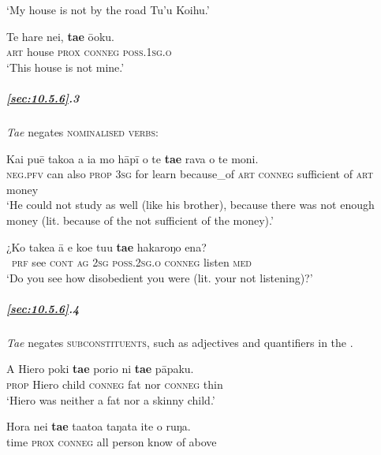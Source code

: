 \glt 
‘My house is not by the road Tu’u Koihu.’ \textstyleExampleref{[Notes]}
\z

\ea\label{ex:10.144}
\gll Te hare nei, \textbf{ta{\ꞌ}e} ō{\ꞌ}oku. \\
\textsc{art} house \textsc{prox} \textsc{conneg} \textsc{poss.1sg.o} \\

\glt 
‘This house is not mine.’ \textstyleExampleref{[R229.268]} 
\z

\subparagraph{\ref{sec:10.5.6}.3} \textit{Ta{\ꞌ}e} negates \textsc{nominalised verbs}:

\ea\label{ex:10.145}
\gll Kai puē tako{\ꞌ}a a ia mo hāpī {\ꞌ}o te \textbf{ta{\ꞌ}e} rava o te moni.\\
\textsc{neg.pfv} can also \textsc{prop} \textsc{3sg} for learn because\_of \textsc{art} \textsc{conneg} sufficient of \textsc{art} money\\

\glt 
‘He could not study as well (like his brother), because there was not enough money (lit. because of the not sufficient of the money).’ \textstyleExampleref{[R231.006]} 
\z

\ea\label{ex:10.146}
\gll ¿Ko take{\ꞌ}a {\ꞌ}ā e koe tu{\ꞌ}u \textbf{ta{\ꞌ}e} hakaroŋo ena? \\
~\textsc{prf} see \textsc{cont} \textsc{ag} \textsc{2sg} \textsc{poss.2sg.o} \textsc{conneg} listen \textsc{med} \\

\glt 
‘Do you see how disobedient you were (lit. your not listening)?’ \textstyleExampleref{[R481.117]} 
\z

\subparagraph{\ref{sec:10.5.6}.4} \textit{Ta{\ꞌ}e} negates \textsc{subconstituents}, such as adjectives  and quantifiers  in the .

\ea\label{ex:10.147}
\gll A Hiero poki \textbf{ta{\ꞌ}e} porio ni \textbf{ta{\ꞌ}e} pāpaku. \\
\textsc{prop} Hiero child \textsc{conneg} fat nor \textsc{conneg} thin \\

\glt 
‘Hiero was neither a fat nor a skinny child.’ \textstyleExampleref{[R315.020]} 
\z

\ea\label{ex:10.148}
\gll Hora nei \textbf{ta{\ꞌ}e} ta{\ꞌ}ato{\ꞌ}a taŋata {\ꞌ}ite o ruŋa. \\
time \textsc{prox} \textsc{conneg} all person know of above \\

